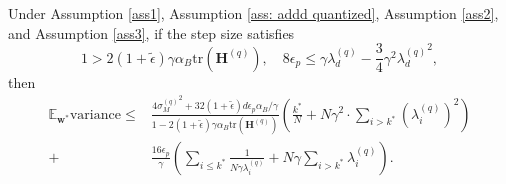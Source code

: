 \documentclass[11pt, letterpaper]{article}
\begin{document}
\begin{lemma}
    \label{lem: f6}
    Under Assumption \ref{ass1}, Assumption \ref{ass: addd quantized}, Assumption \ref{ass2}, and Assumption \ref{ass3}, if the step size satisfies
    \begin{equation*}
        1>2(1+\tilde{\epsilon})\gamma\alpha_B\mathrm{tr}(\mathbf{H}^{(q)}),\quad 8\epsilon_p\leq \gamma \lambda_d^{(q)}-\frac{3}{4}\gamma^2{\lambda_d^{(q)}}^2,
    \end{equation*}
    then
    \begin{equation*}
        \begin{aligned}
            \mathbb{E}_{\mathbf{w}^*}\mathrm{variance}\leq &\frac{4{\sigma_M^{(q)}}^2+32(1+\tilde{\epsilon}){d\epsilon_p}\alpha_B/\gamma}{1-2(1+\tilde{\epsilon})\gamma\alpha_B\mathrm{tr}(\mathbf{H}^{(q)})}\left(\frac{k^*}{N}+N\gamma^2\cdot\sum_{i>k^*}(\lambda_i^{(q)})^2\right)\\
            +
            &\frac{16\epsilon_p}{\gamma}\left(\sum_{i\leq k^*}\frac{1}{N\gamma\lambda_i^{(q)}}+N\gamma\sum_{i>k^*}\lambda_i^{(q)}\right).
        \end{aligned}
    \end{equation*}
\end{lemma}
\end{document}
